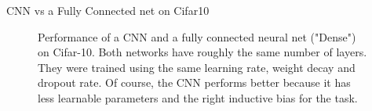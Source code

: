 \documentclass[11pt,compress,t,notes=noshow]{beamer}
\begin{document}
\begin{frame} {CNN vs a Fully Connected net on Cifar10}
  \begin{figure}
        \centering
        \caption{Performance of a CNN and a fully connected neural net ("Dense") on Cifar-10. Both networks have roughly the same number of layers. They were trained using the same learning rate, weight decay and dropout rate. Of course, the CNN performs better because it has less learnable parameters and the right inductive bias for the task.}
    \end{figure} 
\end{frame}
\end{document}
